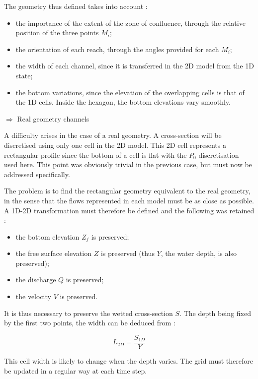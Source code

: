 The geometry thus defined takes into account :

\begin{itemize}
 \item the importance of the extent of the zone of confluence, through the relative position of the three points $M_i$;
 \item the orientation of each reach, through the angles provided for each $M_i$;
 \item the width of each channel, since it is transferred in the 2D model from the 1D state;
 \item the bottom variations, since the elevation of the overlapping cells is that of the 1D cells. Inside the hexagon, the bottom elevations vary smoothly.
\end{itemize}

$\Longrightarrow$ Real geometry channels

A difficulty arises in the case of a real geometry. A cross-section will be discretised using only one cell in the 2D model. This 2D cell represents a rectangular profile since the bottom of a cell is flat with the $P_0$ discretisation used here. This point was obviously trivial in the previous case, but must now be addressed specifically.

The problem is to find the rectangular geometry equivalent to the real geometry, in the sense that the flows represented in each model must be as close as possible. A 1D-2D transformation must therefore be defined and the following was retained :
\begin{itemize}
 \item the bottom elevation $Z_f$ is preserved;
 \item the free surface elevation $Z$ is preserved (thus $Y$, the water depth, is also preserved);
 \item the discharge $Q$ is preserved;
 \item the velocity $V$ is preserved.
\end{itemize}

It is thus necessary to preserve the wetted cross-section $S$. The depth being fixed by the first two points, the width can be deduced from :

\begin{equation}
 L_{2D} = \frac{S_{1D}}{Y}
\end{equation}

This cell width is likely to change when the depth varies. The grid must therefore be updated in a regular way at each time step.

